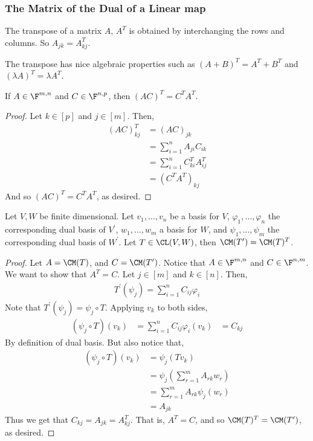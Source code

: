 \documentclass{article}
\begin{document}
\subsubsection{The Matrix of the Dual of a Linear map}
  \begin{defn}
    The transpose of a matrix $A$, $A^T$ is obtained by interchanging the rows and columns. So $A_{jk} = A^T_{kj}$.
  \end{defn}
  The transpose has nice algebraic properties such as $(A + B)^T = A^T + B^T$ and $(\lambda A)^T = \lambda A^T$.
  \begin{prop}
    If $A \in \F^{m, n}$ and $C \in \F^{n, p}$, then $(AC)^T = C^TA^T$.
  \end{prop}
  \begin{proof}
    Let $k \in [p]$ and $j \in [m]$. Then,
    \begin{align*}
      (AC)^T_{kj} & = (AC)_{jk} \\
      & = \sum_{i = 1}^{n}A_{ji}C_{ik} \\
      & = \sum_{i = 1}^{n}C^T_{ki}A^T_{ij} \\
      & = (C^TA^T)_{kj}
    \end{align*}
    And so $(AC)^T = C^TA^T$, as desired.
  \end{proof} 
  \begin{prop}
    Let $V, W$ be finite dimensional. Let $v_1, \dots, v_n$ be a basis for $V$, $\varphi_1, \dots, \varphi_n$ the corresponding dual basis of $V^{\prime}$, $w_1, \dots, w_m$ a basis for $W$,
    and $\psi_1, \dots, \psi_m$ the corresponding dual basis of $W^{\prime}$. Let $T \in \CL(V, W)$, then $\CM(T^{\prime}) = \CM(T)^T$.
  \end{prop}
  \begin{proof}
    Let $A = \CM(T)$, and $C = \CM(T^{\prime})$. Notice that $A \in \F^{m, n}$ and $C \in \F^{n, m}$. We want to show that $A^T = C$. Let $j \in [m]$ and $k \in [n]$. Then,
    \begin{align*}
      T^{\prime}(\psi_j) = \sum_{i = 1}^{n}C_{ij}\varphi_i
    \end{align*}
    Note that $T^{\prime}(\psi_j) = \psi_j \circ T$. Applying $v_k$ to both sides,
    \begin{align*}
      (\psi_j \circ T)(v_k) & = \sum_{i = 1}^{n}C_{ij}\varphi_i(v_k)
      & = C_{kj}
    \end{align*}
    By definition of dual basis. But also notice that,
    \begin{align*}
      (\psi_j \circ T)(v_k) & = \psi_j(Tv_k) \\
      & = \psi_j(\sum_{r = 1}^{m}A_{rk}w_r) \\
      & = \sum_{r = 1}^{m}A_{rk}\psi_j(w_r) \\
      & = A_{jk}
    \end{align*}
    Thus we get that $C_{kj} = A_{jk} = A_{kj}^{T}$. That is, $A^T = C$, and so $\CM(T)^T = \CM(T^{\prime})$, as desired.
  \end{proof}
\end{document}
